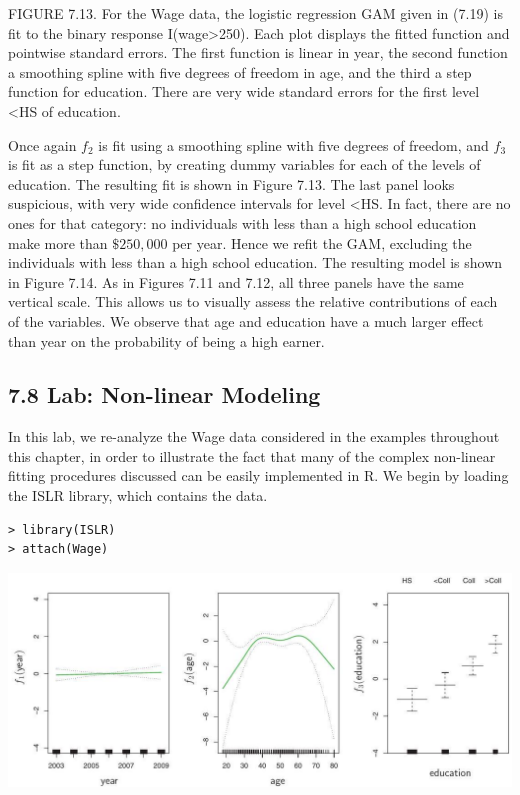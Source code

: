 \documentclass[10pt]{article}
\begin{document}
FIGURE 7.13. For the Wage data, the logistic regression GAM given in (7.19) is fit to the binary response I(wage>250). Each plot displays the fitted function and pointwise standard errors. The first function is linear in year, the second function a smoothing spline with five degrees of freedom in age, and the third a step function for education. There are very wide standard errors for the first level <HS of education.

Once again $f_{2}$ is fit using a smoothing spline with five degrees of freedom, and $f_{3}$ is fit as a step function, by creating dummy variables for each of the levels of education. The resulting fit is shown in Figure 7.13. The last panel looks suspicious, with very wide confidence intervals for level <HS. In fact, there are no ones for that category: no individuals with less than a high school education make more than $\$ 250,000$ per year. Hence we refit the GAM, excluding the individuals with less than a high school education. The resulting model is shown in Figure 7.14. As in Figures 7.11 and 7.12, all three panels have the same vertical scale. This allows us to visually assess the relative contributions of each of the variables. We observe that age and education have a much larger effect than year on the probability of being a high earner.

\subsection*{7.8 Lab: Non-linear Modeling}
In this lab, we re-analyze the Wage data considered in the examples throughout this chapter, in order to illustrate the fact that many of the complex non-linear fitting procedures discussed can be easily implemented in R. We begin by loading the ISLR library, which contains the data.

\begin{verbatim}
> library(ISLR)
> attach(Wage)
\end{verbatim}

\begin{center}
\includegraphics[max width=\textwidth]{2025_05_05_efe77898333945044de4g-303}
\end{center}
\end{document}

